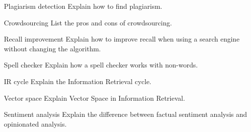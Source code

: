 \documentclass{article}
\begin{document}
\begin{exercise}{Plagiarism detection}
  Explain how to find plagiarism.

  \begin{solution}
  \end{solution}
\end{exercise}

\begin{exercise}{Crowdsourcing}
  List the pros and cons of crowdsourcing.

  \begin{solution}
  \end{solution}
\end{exercise}

\begin{exercise}{Recall improvement}
  Explain how to improve recall when using a search engine without changing the algorithm.

  \begin{solution}
  \end{solution}
\end{exercise}

\begin{exercise}{Spell checker}
  Explain how a spell checker works with non-words.

  \begin{solution}
  \end{solution}
\end{exercise}

\begin{exercise}{IR cycle}
  Explain the Information Retrieval cycle.

  \begin{solution}
  \end{solution}
\end{exercise}

\begin{exercise}{Vector space}
  Explain Vector Space in Information Retrieval.

  \begin{solution}
  \end{solution}
\end{exercise}

\begin{exercise}{Sentiment analysis}
  Explain the difference between factual sentiment analysis and opinionated analysis.

  \begin{solution}
  \end{solution}
\end{exercise}
\end{document}
